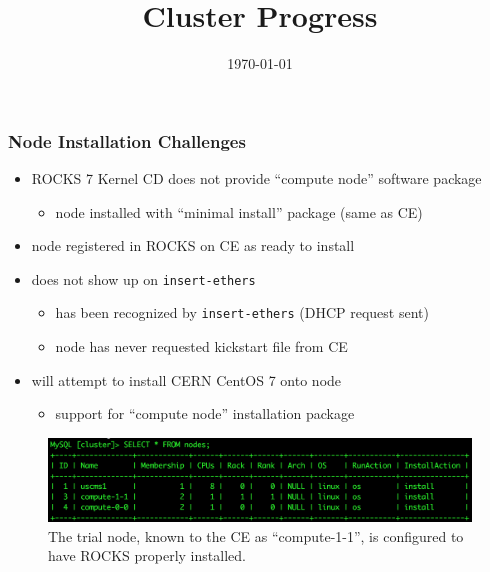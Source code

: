 \documentclass{beamer}
\title{Cluster Progress}
\date{\today}
\begin{document}

\begin{frame}
\titlepage
\end{frame}



\begin{frame}

  \frametitle{Node Installation Challenges}

  \begin{itemize}
    \item ROCKS 7 Kernel CD does not provide ``compute node'' software package
    \begin{itemize}
      \item node installed with ``minimal install'' package (same as CE)
    \end{itemize}
    \item node registered in ROCKS on CE as ready to install
    \item does not show up on {\tt insert-ethers}
      \begin{itemize}
        \item has been recognized by {\tt insert-ethers} (DHCP request sent)
        \item node has never requested kickstart file from CE
      \end{itemize}
    \item will attempt to install CERN CentOS 7 onto node
      \begin{itemize}
        \item support for ``compute node'' installation package
      \end{itemize}
  \end{itemize}

  \begin{figure}[H]
    \begin{center}
      \includegraphics[scale=0.4]{mysqlNodes.png}
    \end{center}
    \caption{The trial node, known to the CE as ``compute-1-1'', is configured to
      have ROCKS properly installed.}
  \end{figure}
  
\end{frame}

\end{document}
